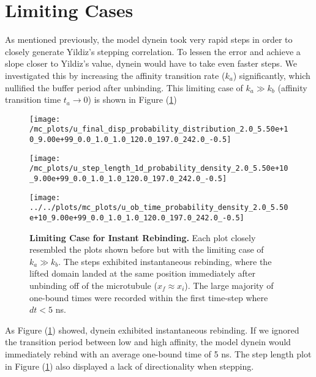 \newpage
\section{Limiting Cases}\label{sec:LimitingCases} 

As mentioned previously, the model dynein took very rapid steps in order to closely generate Yildiz's stepping correlation. To lessen the error and achieve a slope closer to Yildiz's value, dynein would have to take even faster steps. We investigated this by increasing the affinity transition rate ($k_a$) significantly, which nullified the buffer period after unbinding. This limiting case of $k_a\gg k_b$ (affinity transition time $t_a\to 0$) is shown in Figure (\ref{fig:DataFitYildiz99})

\begin{figure}[H]
	\begin{minipage}[b]{0.5\textwidth}
	\texttt{[image: /mc\_plots/u\_final\_disp\_probability\_distribution\_2.0\_5.50e+10\_9.00e+99\_0.0\_1.0\_1.0\_120.0\_197.0\_242.0\_-0.5]}
	\end{minipage}
	\begin{minipage}[b]{0.6\textwidth}		
	\texttt{[image: /mc\_plots/u\_step\_length\_1d\_probability\_density\_2.0\_5.50e+10\_9.00e+99\_0.0\_1.0\_1.0\_120.0\_197.0\_242.0\_-0.5]}
	\end{minipage}	
	\begin{center}
	\texttt{[image: ../../plots/mc\_plots/u\_ob\_time\_probability\_density\_2.0\_5.50e+10\_9.00e+99\_0.0\_1.0\_1.0\_120.0\_197.0\_242.0\_-0.5]}
	\end{center}	
	\caption[Limiting Case]{\textbf{Limiting Case for Instant Rebinding.} Each plot closely resembled the plots shown before but with the limiting case of $k_a\gg k_b$. The steps exhibited instantaneous rebinding, where the lifted domain landed at the same position immediately after unbinding off of the microtubule ($x_f\approx x_i$). The large majority of one-bound times were recorded within the first time-step where $dt<5$ ns.} 
	\label{fig:DataFitYildiz99}
\end{figure}

As Figure (\ref{fig:DataFitYildiz99}) showed, dynein exhibited instantaneous rebinding. If we ignored the transition period between low and high affinity, the model dynein would immediately rebind with an average one-bound time of 5 ns. The step length plot in Figure (\ref{fig:DataFitYildiz99}) also displayed a lack of directionality when stepping. 


